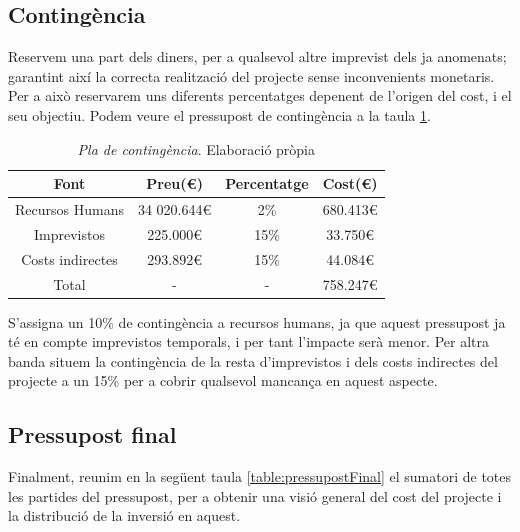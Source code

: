 \documentclass[a4paper]{article} %
\begin{document}
	
	\subsection{Contingència}
	Reservem una part dels diners, per a qualsevol altre imprevist dels ja anomenats; garantint així la correcta realització del projecte sense inconvenients monetaris. Per a això reservarem uns diferents percentatges depenent de l'origen del cost, i el seu objectiu. Podem veure el pressupost de contingència a la taula \ref{table:contingencia}.
	
	\begin{table}[h!]
		\centering
		\begin{tabular}{|| c || c | c | c |}
			\hline
			\textbf{Font} & \textbf{Preu(\euro)} & \textbf{Percentatge} & \textbf{Cost(\euro)} \\
			\hline \hline
			Recursos Humans & 34 020.644\euro & 2\% & 680.413\euro \\
			\hline
			Imprevistos & 225.000\euro & 15\% & 33.750\euro \\
			\hline
			Costs indirectes & 293.892\euro & 15\% & 44.084\euro \\
			\hline \hline
			Total & - & - & 758.247\euro \\
			\hline
		\end{tabular}
		\caption[\textit{Pla de contingència}]{\textit{\small Pla de contingència}. Elaboració pròpia}
		\label{table:contingencia}
	\end{table}

	S'assigna un 10\% de contingència a recursos humans, ja que aquest pressupost ja té en compte imprevistos temporals, i per tant l'impacte serà menor. Per altra banda situem la contingència de la resta d'imprevistos i dels costs indirectes del projecte a un 15\% per a cobrir qualsevol mancança en aquest aspecte.
	
	\subsection{Pressupost final}
	Finalment, reunim en la següent taula \ref{table:pressupostFinal} el sumatori de totes les partides del pressupost, per a obtenir una visió general del cost del projecte i la distribució de la inversió en aquest.
	
\end{document}
